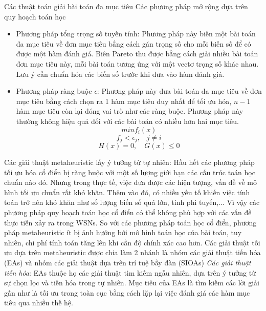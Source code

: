 \documentclass{article}
\begin{document}
Các thuật toán giải bài toán đa mục tiêu \cite{fei2016survey}
\newline Các phương pháp mở rộng dựa trên quy hoạch toán học
\begin{itemize}
    \item Phương pháp tổng trọng số tuyến tính: Phương pháp này biến một bài toán đa mục tiêu về đơn mục tiêu bắng cách gán trọng số cho mỗi biến số để có được một hàm đánh giá. Biên Pareto thu được bằng cách giải nhiều bài toán đơn mục tiêu này, mỗi bài toán tương ứng với một vectơ trọng số khác nhau. Lưu ý cần chuẩn hóa các biến số trước khi đưa vào hàm đánh giá.
    \item Phương pháp ràng buộc $\epsilon$: Phương pháp này đưa bài toán đa mục tiêu về đơn mục tiêu bằng cách chọn ra 1 hàm mục tiêu duy nhất để tối ưu hóa, $n-1$  hàm mục tiêu còn lại đóng vai trò như các ràng buộc. Phương pháp này thường không hiệu quả đối với các bài toán có nhiều hơn hai mục tiêu.
    $$ min f_i(x) $$
    $$ f_j < \epsilon_j \text{,} \quad j \neq i$$
    $$ H(x) = 0, \quad G(x) \leq 0$$
\end{itemize}
Các giải thuật metaheuristic lấy ý tưởng từ tự nhiên: Hầu hết các phương pháp tối ưu hóa cổ điển bị ràng buộc với một số lượng giới hạn các cấu trúc toán học chuẩn nào đó. Nhưng trong thực tế, việc đưa được các hiện tượng, vấn đề về mô hình tối ưu chuẩn rất khó khăn. Thêm vào đó, có nhiều yếu tố khiến việc tính toán trở nên khó khăn như số lượng biến số quá lớn, tính phi tuyến,... Vì vậy các phương pháp quy hoạch toán học cổ điển có thể không phù hợp với các vấn đề thực tiễn xảy ra trong \gls{WSNs}.
\newline So với các phương pháp toán học cổ điển, phương pháp metaheuristic ít bị ảnh hưởng bởi mô hình toán học của bài toán, tuy nhiên, chi phí tính toán tăng lên khi cần độ chính xác cao hơn. Các giải thuật tối ưu dựa trên metaheuristic được chia làm 2 nhánh là nhóm các giải thuật tiến hóa (\gls{EAs}) và nhóm các giải thuật dựa trên trí tuệ bầy đàn (\gls{SIOAs})
\newline \emph{Các giải thuật tiến hóa}: \gls{EAs} thuộc họ các giải thuật tìm kiếm ngẫu nhiên, dựa trên ý tưởng từ sự chọn lọc và tiến hóa trong tự nhiên. Mục tiêu của EAs là tìm kiếm các lời giải  gần như là tối ưu trong toàn cục bằng cách lặp lại việc đánh giá các hàm mục tiêu qua nhiều thế hệ.
\end{document}
